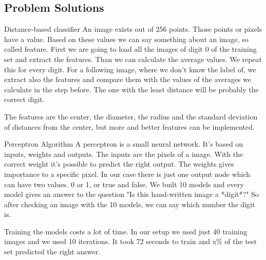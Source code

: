 \documentclass{article}
\begin{document}
\subsection{Problem Solutions}
Distance-based classifier
An image exists out of 256 points. Those points or pixels have a value. Based on these values we can say something about an image, so called feature. First we are going to load all the images of digit 0 of the training set and extract the features. Than we can calculate the average values. We repeat this for every digit. For a following image, where we don't know the label of, we extract also the features and compare them with the values of the averages we calculate in the step before. The one with the least distance will be probably the correct digit.

The features are the center, the diameter, the radius and the standard deviation of distances from the center, but more and better features can be implemented. 

Perceptron Algorithm
A perceptron is a small neural network. It's based on inputs, weights and outputs. The inputs are the pixels of a image. With the correct weight it's possible to predict the right output. The weights gives importance to a specific pixel. In our case there is just one output node which can have two values. 0 or 1, or true and false. We built 10 models and every model gives an answer to the question "Is this hand-written image a *digit*?" So after checking an image with the 10 models, we can say which number the digit is. 

Training the models costs a lot of time. In our setup we used just 40 training images and we used 10 iterations. It took 72 seconds to train and x\% of the test set predicted the right answer. 
\end{document}
